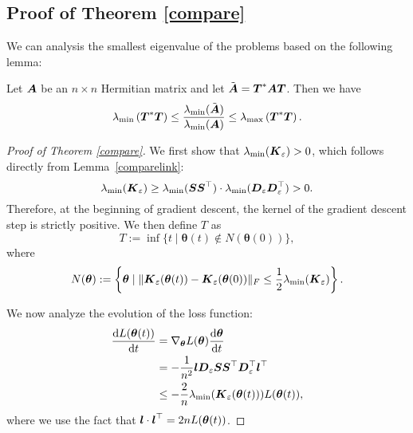 \subsection{Proof of Theorem \ref{compare}}
We can analysis the smallest eigenvalue of the problems based on the following lemma:
\begin{lemma}\label{comparelink}
   Let $\boldsymbol{A}$ be an $n \times n$ Hermitian matrix and let $\tilde{\boldsymbol{A}}=\boldsymbol{T}^* \boldsymbol{A} \boldsymbol{T}$. Then we have
$$
\lambda_{\text{min}}\left(\boldsymbol{T}^* \boldsymbol{T}\right) \leq  \frac{\lambda_{\text{min}}(\tilde{\boldsymbol{A}})}{\lambda_{\text{min}}(\boldsymbol{A})} \leq \lambda_{\text{max}}\left(\boldsymbol{T}^* \boldsymbol{T}\right).
$$

\end{lemma}
\begin{proof}[Proof of Theorem \ref{compare}]
    We first show that \( \lambda_{\text{min}}(\boldsymbol{K}_\varepsilon) > 0 \), which follows directly from Lemma~\ref{comparelink}:
    \[
    \lambda_{\text{min}}(\boldsymbol{K}_\varepsilon) \geq \lambda_{\text{min}}(\boldsymbol{S}\boldsymbol{S}^\top) \cdot \lambda_{\text{min}}(\boldsymbol{D}_\varepsilon\boldsymbol{D}_\varepsilon^\top) > 0.
    \]
    Therefore, at the beginning of gradient descent, the kernel of the gradient descent step is strictly positive. We then define \( T \) as
    \begin{equation}
        T := \inf\{t \mid \boldsymbol{\theta}(t) \not\in N(\boldsymbol{\theta}(0))\},\label{t_1}
    \end{equation}
    where
    \[
    N(\boldsymbol{\theta}) := \left\{\boldsymbol{\theta} \mid \|\boldsymbol{K}_\varepsilon(\boldsymbol{\theta}(t)) - \boldsymbol{K}_\varepsilon(\boldsymbol{\theta}(0))\|_F \leq \frac{1}{2} \lambda_{\text{min}}(\boldsymbol{K}_\varepsilon) \right\}.
    \]

    We now analyze the evolution of the loss function:
    \begin{align}
    \frac{\mathrm{d} L(\boldsymbol{\theta}(t))}{\mathrm{d} t} &= \nabla_{\boldsymbol{\theta}} L(\boldsymbol{\theta}) \frac{\mathrm{d} \boldsymbol{\theta}}{\mathrm{d} t} \notag \\
    &= -\frac{1}{n^2} \boldsymbol{l} \boldsymbol{D}_\varepsilon \boldsymbol{S} \boldsymbol{S}^{\top} \boldsymbol{D}_\varepsilon^{\top} \boldsymbol{l}^{\top} \notag \\
    &\leq -\frac{2}{n} \lambda_{\text{min}}(\boldsymbol{K}_\varepsilon(\boldsymbol{\theta}(t))) L(\boldsymbol{\theta}(t)),
    \end{align}
    where we use the fact that \( \boldsymbol{l} \cdot \boldsymbol{l}^\top = 2n L(\boldsymbol{\theta}(t)) \).


\end{proof}
